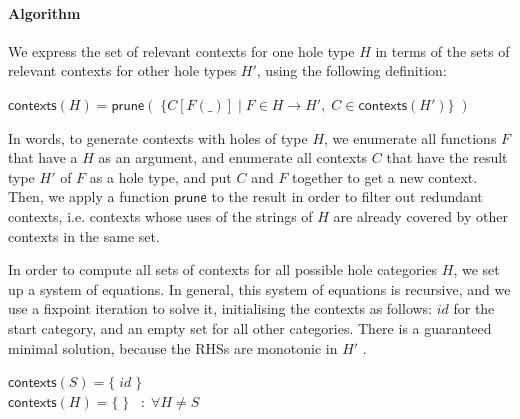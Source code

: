 % 

\paragraph{Algorithm}




\noindent We express the set of relevant contexts for one hole type
$H$ in terms of the sets of relevant contexts for other hole types
$H'$, using the following definition:

\begin{EmptyItem}
$\textsf{contexts}(H) = \textsf{prune}(\;\{ C[F(\_)] \; | \; F \in H
\rightarrow H', \; C \in \textsf{contexts}(H') \}\;)$
\end{EmptyItem}

In words, to generate contexts with holes of type $H$, we enumerate
all functions $F$ that have a $H$ as an argument, and enumerate all
contexts $C$ that have the result type $H'$ of $F$ as a hole type, and
put $C$ and $F$ together to get a new context. Then, we apply a
function $\textsf{prune}$ to the result in order to filter out
redundant contexts, i.e. contexts whose uses of the strings of $H$ are
already covered by other contexts in the same set.

In order to compute all sets of contexts for all possible hole
categories $H$, we set up a system of equations. In general, this
system of equations is recursive, and we use a fixpoint iteration to
solve it, initialising the contexts as follows: $id$ for the start
category, and an empty set for all other categories. There is a guaranteed minimal solution, because the RHSs are monotonic
in $H'$ \cite{lassez1982fixed}.

\begin{EmptyItem}
$\textsf{contexts}(S) = \{ \; id \; \}$ \\
$\textsf{contexts}(H) = \{ \; \} \;\;\; : \; \forall H \neq S$
\end{EmptyItem}


